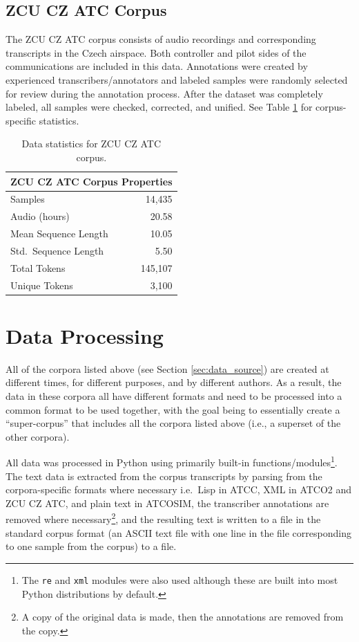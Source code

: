 \documentclass[12pt]{article}
\begin{document}
\subsection{ZCU CZ ATC Corpus}\label{sec:zcu_atc}
The ZCU CZ ATC corpus consists of audio recordings and corresponding transcripts in the Czech airspace. Both controller and pilot sides of the
communications are included in this data. Annotations were created by experienced transcribers/annotators and labeled samples were randomly selected
for review during the annotation process. After the dataset was completely labeled, all samples were checked, corrected, and
unified\cite{smidl_air_2019}. See Table \ref{tab:zcu_cz_atc_stats} for corpus-specific statistics.

\begin{table}
    \centering
    \begin{tabular}{l r}
        \toprule
        \multicolumn{2}{c}{ZCU CZ ATC Corpus Properties} \\
        \midrule
        Samples              & 14,435                    \\
        Audio (hours)        & 20.58                     \\
        Mean Sequence Length & 10.05                     \\
        Std.~Sequence Length & 5.50                      \\
        Total Tokens         & 145,107                   \\
        Unique Tokens        & 3,100                     \\
        \bottomrule
    \end{tabular}
    \caption{Data statistics for ZCU CZ ATC corpus.}
    \label{tab:zcu_cz_atc_stats}
\end{table}

\section{Data Processing}\label{sec:data_processing}
All of the corpora listed above (see Section \ref{sec:data_source}) are created at different times, for different purposes, and by different authors.
As a result, the data in these corpora all have different formats and need to be processed into a common format to be used together, with the goal
being to essentially create a ``super-corpus'' that includes all the corpora listed above (i.e., a superset of the other corpora).

All data was processed in Python using primarily built-in functions/modules\footnote{The \lstinline|re| and \lstinline|xml| modules were also used
    although these are built into most Python distributions by default.}. The text data is extracted from the corpus transcripts by parsing from the
corpora-specific formats where necessary i.e.~Lisp in ATCC, XML in ATCO2 and ZCU CZ ATC, and plain text in ATCOSIM, the transcriber annotations
are removed where necessary\footnote{A copy of the original data is made, then the annotations are removed from the copy.}, and the resulting text
is written to a file in the standard corpus format (an ASCII text file with one line in the file corresponding to one sample from the corpus) to a
file.
\end{document}
